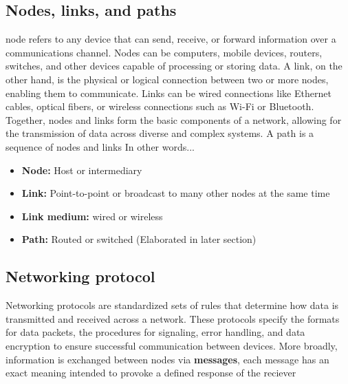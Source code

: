 \documentclass{report}
\begin{document}
    \subsection{Nodes, links, and paths}
    \bigbreak \noindent 
     node refers to any device that can send, receive, or forward information over a communications channel. Nodes can be computers, mobile devices, routers, switches, and other devices capable of processing or storing data.
     \bigbreak \noindent 
     A link, on the other hand, is the physical or logical connection between two or more nodes, enabling them to communicate. Links can be wired connections like Ethernet cables, optical fibers, or wireless connections such as Wi-Fi or Bluetooth.
     \bigbreak \noindent 
     Together, nodes and links form the basic components of a network, allowing for the transmission of data across diverse and complex systems.
     \bigbreak \noindent 
     A path is a sequence of nodes and links
     \bigbreak \noindent 
     In other words...
     \begin{itemize}
         \item \textbf{Node:} Host or intermediary
         \item \textbf{Link:} Point-to-point or broadcast to many other nodes at the same time
        \item \textbf{Link medium:} wired or wireless
        \item \textbf{Path:} Routed or switched (Elaborated in later section)
     \end{itemize}
     \bigbreak \noindent 
     \subsection{Networking protocol}
     \bigbreak \noindent 
     Networking protocols are standardized sets of rules that determine how data is transmitted and received across a network. These protocols specify the formats for data packets, the procedures for signaling, error handling, and data encryption to ensure successful communication between devices.
     \bigbreak \noindent 
     More broadly, information is exchanged between nodes via \textbf{messages}, each message has an exact meaning intended to provoke a defined response of the reciever
     \bigbreak \noindent 
\end{document}
